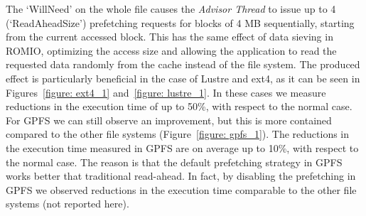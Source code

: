 The `WillNeed' on the whole file causes the \textit{Advisor Thread} to issue up to 4 (`ReadAheadSize') prefetching requests for blocks of 4 MB sequentially, starting from the current accessed 
block. This has the same effect of data sieving in ROMIO, optimizing the access size and allowing the application to read the requested data randomly from the cache instead of the file system. The produced effect is 
particularly beneficial in the case of Lustre and ext4, as it can be seen in Figures~\ref{figure: ext4_1} and~\ref{figure: lustre_1}. In these cases we measure reductions in the execution time of up to 50\%, with respect 
to the normal case. For GPFS we can still observe an improvement, but this is more contained compared to the other file systems (Figure~\ref{figure: gpfs_1}). The reductions in the execution time measured in GPFS are on 
average up to 10\%, with respect to the normal case. The reason is that the default prefetching strategy in GPFS works better that traditional read-ahead. In fact, by disabling the prefetching in GPFS we observed reductions 
in the execution time comparable to the other file systems (not reported here).

